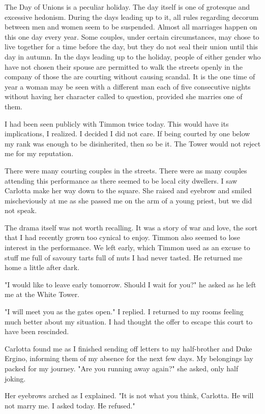 \documentclass{article}
\begin{document}
The Day of Unions is a peculiar holiday. The day itself is one of grotesque and excessive hedonism. During the days leading up to it, all rules regarding decorum between men and women seem to be suspended. Almost all marriages happen on this one day every year. Some couples, under certain circumstances, may chose to live together for a time before the day, but they do not seal their union until this day in autumn. In the days leading up to the holiday, people of either gender who have not chosen their spouse are permitted to walk the streets openly in the company of those the are courting without causing scandal. It is the one time of year a woman may be seen with a different man each of five consecutive nights without having her character called to question, provided she marries one of them. 

I had been seen publicly with Timmon twice today. This would have its implications, I realized. I decided I did not care. If being courted by one below my rank was enough to be disinherited, then so be it. The Tower would not reject me for my reputation.

There were many courting couples in the streets. There were as many couples attending this performance as there seemed to be local city dwellers. I saw Carlotta make her way down to the square. She raised and eyebrow and smiled mischeviously at me as she passed me on the arm of a young priest, but we did not speak.

The drama itself was not worth recalling. It was a story of war and love, the sort that I had recently grown too cynical to enjoy. Timmon also seemed to lose interest in the performance. We left early, which Timmon used as an excuse to stuff me full of savoury tarts full of nuts I had never tasted. He returned me home a little after dark.

"I would like to leave early tomorrow. Should I wait for you?" he asked as he left me at the White Tower. 

"I will meet you as the gates open." I replied. I returned to my rooms feeling much better about my situation. I had thought the offer to escape this court to have been rescinded. 

Carlotta found me as I finished sending off letters to my half-brother and Duke Ergino, informing them of my absence for the next few days. My belongings lay packed for my journey. "Are you running away again?" she asked, only half joking.

Her eyebrows arched as I explained. "It is not what you think, Carlotta. He will not marry me. I asked today. He refused."
\end{document}
